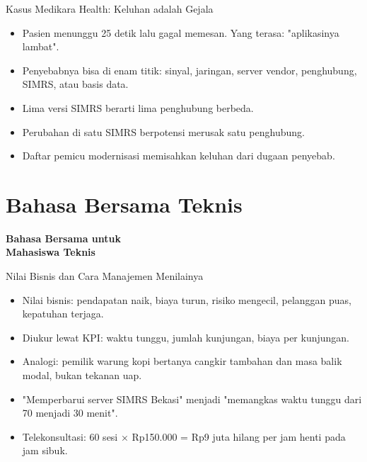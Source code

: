 \documentclass[aspectratio=169, table, 12pt]{beamer}
\begin{document}
\begin{frame}{Kasus Medikara Health: Keluhan adalah Gejala}
  \begin{itemize}
    \item Pasien menunggu 25 detik lalu gagal memesan. Yang terasa: "aplikasinya
          lambat".
    \item Penyebabnya bisa di enam titik: sinyal, jaringan, server vendor,
          penghubung, SIMRS, atau basis data.
    \item Lima versi SIMRS berarti lima penghubung berbeda.
    \item Perubahan di satu SIMRS berpotensi merusak satu penghubung.
    \item Daftar pemicu modernisasi memisahkan keluhan dari dugaan penyebab.
  \end{itemize}
\end{frame}

\section{Bahasa Bersama Teknis}

\begin{frame}{\hfill}
  \centering
  \Huge{\textbf{Bahasa Bersama untuk\\Mahasiswa Teknis}}
\end{frame}

\begin{frame}{Nilai Bisnis dan Cara Manajemen Menilainya}
  \begin{itemize}
    \item Nilai bisnis: pendapatan naik, biaya turun, risiko mengecil, pelanggan
          puas, kepatuhan terjaga.
    \item Diukur lewat KPI: waktu tunggu, jumlah kunjungan, biaya per kunjungan.
    \item Analogi: pemilik warung kopi bertanya cangkir tambahan dan masa balik
          modal, bukan tekanan uap.
    \item "Memperbarui server SIMRS Bekasi" menjadi "memangkas waktu tunggu dari 70
          menjadi 30 menit".
    \item Telekonsultasi: 60 sesi × Rp150.000 = Rp9 juta hilang per jam henti pada
          jam sibuk.
  \end{itemize}
\end{frame}
\end{document}
